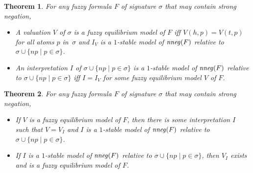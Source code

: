 \documentclass[runningheads]{llncs}
\def\i#1{\hbox{\it #1\/}}
\def\i#1{\hbox{\itshape #1\/}}
\newtheorem{thm}{Theorem}
\begin{document}



\begin{thm}\label{thm:equil-sm}
For any fuzzy formula $F$ of signature $\sigma$ that may contain strong negation, 
\begin{itemize}
\item[(a)]  A valuation $V$ of $\sigma$ is a fuzzy equilibrium model
  of $F$ iff $V(h,p)=V(t,p)$ for all atoms $p$ in~$\sigma$ and $I_V$ is a
  $1$-stable model of $\i{nneg}(F)$ relative to $\sigma\cup\{np \mid
  p\in\sigma\}$.

\item[(b)] An interpretation $I$ of $\sigma\cup\{np \mid p\in\sigma\}$ is
  a $1$-stable model of $\i{nneg}(F)$ relative to $\sigma\cup\{np \mid
  p\in\sigma\}$ iff $I=I_V$ for some fuzzy equilibrium model $V$ of
  $F$. 
\end{itemize}
\end{thm}


\BOCC
\begin{thm}\label{thm:equil-sm} 
For any fuzzy formula $F$ of signature $\sigma$ that may contain strong negation, 
\begin{itemize}
\item[(a)]  If $V$ is a fuzzy equilibrium model of $F$, then there is
  some interpretation $I$ such that $V=V_I$ and $I$ is a $1$-stable
  model of $\i{nneg}(F)$ relative to  $\sigma\cup\{np \mid
  p\in\sigma\}$.

\item[(b)]  If $I$ is a $1$-stable model of $\i{nneg}(F)$ relative to
  $\sigma\cup\{np \mid p\in\sigma\}$, then $V_I$ exists and is a fuzzy equilibrium model of $F$. 
\end{itemize}
\end{thm}
\end{document}
